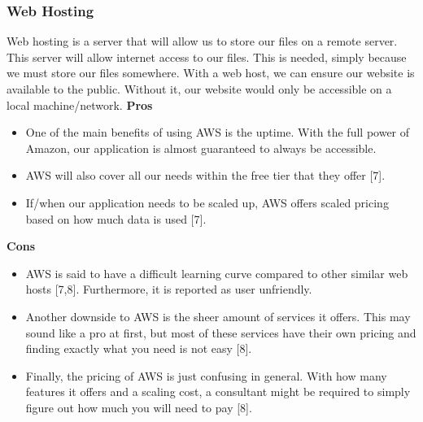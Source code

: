 \subsubsection{Web Hosting}
Web hosting is a server that will allow us to store our files on a remote server. This server will allow internet access to our files. This is needed, simply because we must store our files somewhere. With a web host, we can ensure our website is available to the public. Without it, our website would only be accessible on a local machine/network.
		\textbf{Pros}
			\begin{itemize}
				\item One of the main benefits of using AWS is the uptime. With the full power of Amazon, our application is almost guaranteed to always be accessible. 
				\item AWS will also cover all our needs within the free tier that they offer [7]. 
				\item If/when our application needs to be scaled up, AWS offers scaled pricing based on how much data is used [7].
			\end{itemize}
		\textbf{Cons}
			\begin{itemize}
				\item AWS is said to have a difficult learning curve compared to other similar web hosts [7,8]. Furthermore, it is reported as user unfriendly. 
				\item Another downside to AWS is the sheer amount of services it offers. This may sound like a pro at first, but most of these services have their own pricing and finding exactly what you need is not easy [8]. 
				\item Finally, the pricing of AWS is just confusing in general. With how many features it offers and a scaling cost, a consultant might be required to simply figure out how much you will need to pay [8].
			\end{itemize}
			
